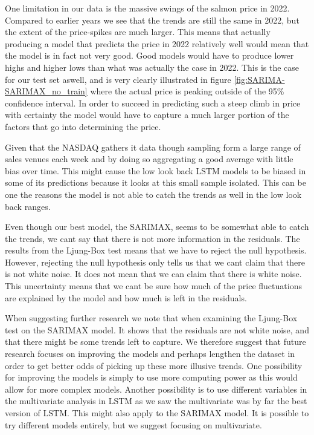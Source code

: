 One limitation in our data is the massive swings of the salmon price in 2022. Compared to earlier years we see that the trends are still the same in 2022, but the extent of the price-spikes are much larger. This means that actually producing a model that predicts the price in 2022 relatively well would mean that the model is in fact not very good. Good models would have to produce lower highs and higher lows than what was actually the case in 2022. This is the case for our test set aswell, and is very clearly illustrated in figure \ref{fig:SARIMA-SARIMAX_no_train} where the actual price is peaking outside of the 95\% confidence interval. In order to succeed in predicting such a steep climb in price with certainty the model would have to capture a much larger portion of the factors that go into determining the price.

Given that the NASDAQ gathers it data though sampling form a large range of sales venues each week and by doing so aggregating a good average with little bias over time. This might cause the low look back LSTM models to be biased in some of its predictions because it looks at this small sample isolated. This can be one the reasons the model is not able to catch the trends as well in the low look back ranges. 

Even though our best model, the SARIMAX, seems to be somewhat able to catch the trends, we cant say that there is not more information in the residuals. The results from the Ljung-Box test means that we have to reject the null hypothesis. However, rejecting the null hypothesis only tells us that we cant claim that there is not white noise. It does not mean that we can claim that there is white noise. This uncertainty means that we cant be sure how much of the price fluctuations are explained by the model and how much is left in the residuals. 

When suggesting further research we note that when
examining the Ljung-Box test on the SARIMAX model. It shows that the residuals are not white noise, and that there might be some trends left to capture. We therefore suggest that future research focuses on improving the models and perhaps lengthen the dataset in order to get better odds of picking up these more illusive trends. One possibility for improving the models is simply to use more computing power as this would allow for more complex models. Another possibility is to use different variables in the multivariate analysis in LSTM as we saw the multivariate was by far the best version of LSTM. This might also apply to the SARIMAX model. It is possible to try different models entirely, but we suggest focusing on multivariate.



